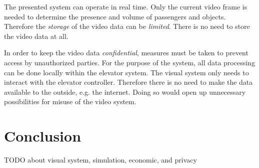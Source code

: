 The presented system can operate in real time.
Only the current video frame is needed to determine the presence and volume of passengers and objects.
Therefore the \emph{storage} of the video data can be \emph{limited}.
There is no need to store the video data at all.

In order to keep the video data \emph{confidential}, 
measures must be taken to prevent access by unauthorized parties.
For the purpose of the system, all data processing can be done locally within the elevator system.
The visual system only needs to interact with the elevator controller.
Therefore there is no need to make the data available to the outside, e.g. the internet.
Doing so would open up unnecessary possibilities for misuse of the video system.

\section{Conclusion}
TODO about visual system, simulation, economic, and privacy